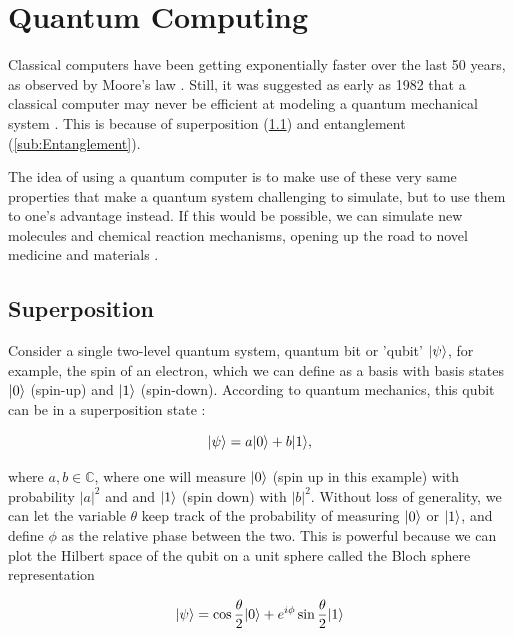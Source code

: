 \section{Quantum Computing}

Classical computers have been getting exponentially faster over the last 50 years, as observed by Moore's law \cite{Moore1965}. Still, it was suggested as early as 1982 that a classical computer may never be efficient at modeling a quantum mechanical system \cite{Feynman1982}. This is because of superposition (\cref{sub:Superposition}) and entanglement (\cref{sub:Entanglement}).

The idea of using a quantum computer is to make use of these very same properties that make a quantum system challenging to simulate, but to use them to one's advantage instead. If this would be possible, we can simulate new molecules and chemical reaction mechanisms, opening up the road to novel medicine \cite{Robert2021} and materials \cite{Ma2020}. 

\subsection{Superposition}\label{sub:Superposition}

Consider a single two-level quantum system, quantum bit or 'qubit' $\lvert\psi\rangle$, for example, the spin of an electron, which we can define as a basis with basis states $\lvert0\rangle$ (spin-up) and $\lvert1\rangle$ (spin-down). According to quantum mechanics, this qubit can be in a superposition state \cite{Griffiths2004}:

\begin{equation}\label{eq:SuperPositionBasic}
	\lvert\psi\rangle=a\lvert0\rangle+b\lvert1\rangle,
\end{equation}

where $a,b \in \mathbb{C}$, where one will measure $\lvert0\rangle$ (spin up in this example) with probability $|a|^2$ and and $\lvert1\rangle$ (spin down) with $|b|^2$. Without loss of generality, we can let the variable $\theta$ keep track of the probability of measuring $\lvert0\rangle$ or $\lvert1\rangle$, and define $\phi$ as the relative phase between the two. This is powerful because we can plot the Hilbert space of the qubit on a unit sphere called the Bloch sphere representation \cite{Nielsen2011}

\begin{equation}\label{eq:BlochSphere}
	\lvert\psi\rangle = 
	\cos{\frac{\theta}{2}} \lvert0\rangle + e^{i \phi} \sin{\frac{\theta}{2}} \lvert1\rangle
\end{equation}

